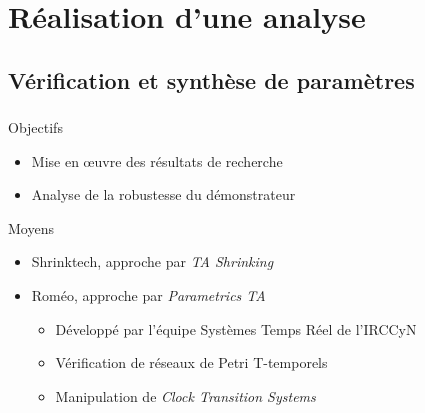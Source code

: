 \documentclass{beamer}
\begin{document}
%

  \section{Réalisation d'une analyse}
    \subsection{Vérification et synthèse de paramètres}
      \begin{frame}
        \frametitle{\secname}
        \framesubtitle{\subsecname}

        \begin{block}{Objectifs}
          \begin{itemize}
            \item Mise en \oe uvre des résultats de recherche
            \item Analyse de la robustesse du démonstrateur
          \end{itemize}
        \end{block}
        \pause

        \begin{block}{Moyens}
          \begin{itemize}
            \item {\footnotesize\cite{sankur13}} Shrinktech, approche par {\it
              TA Shrinking}
            \item {\footnotesize\cite{lime09}} Roméo, approche par {\it
              Parametrics TA}
              \begin{itemize}
                \item Développé par l'équipe Systèmes Temps Réel de l'IRCCyN
                \item Vérification de réseaux de Petri T-temporels
                \item {\footnotesize\cite{lime12}} Manipulation de {\it Clock
                  Transition Systems}
              \end{itemize}
          \end{itemize}
        \end{block}
      \end{frame}
\end{document}
